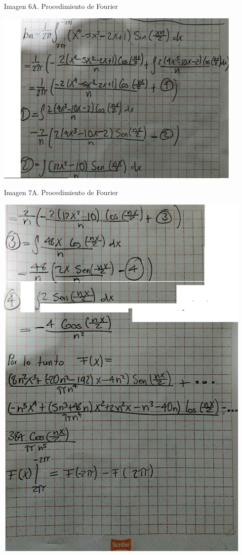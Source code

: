 Imagen 6A. Procedimiento de Fourier

\includegraphics[width=4.74479in,height=3.37337in]{media/image47.png}

Imagen 7A. Procedimiento de Fourier

\includegraphics[width=4.94271in,height=7.29091in]{media/image53.png}

